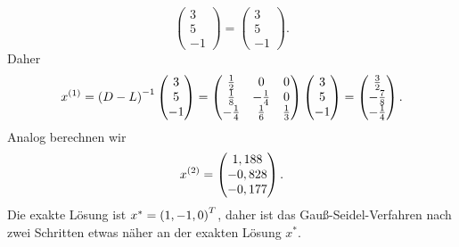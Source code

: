 \documentclass{exercise}
\begin{document}
\begin{enumerate}
\begin{itemize}
\[\begin{pmatrix}
                    3\\
                    5\\
                    -1
                \end{pmatrix} = \begin{pmatrix}
                    3\\
                    5\\
                    -1
                \end{pmatrix}.
            \]
            Daher
            \[
                x^{\parentheses*{1}} = \parentheses*{D - L}^{-1}\begin{pmatrix}
                    3\\
                    5\\
                    -1
                \end{pmatrix} = \begin{pmatrix}
                    \frac{1}{2} & 0 & 0\\
                    \frac{1}{8} & -\frac{1}{4} & 0\\
                    -\frac{1}{4} & \frac{1}{6} & \frac{1}{3}
                \end{pmatrix}\begin{pmatrix}
                    3\\
                    5\\
                    -1
                \end{pmatrix} = \begin{pmatrix}
                    \frac{3}{2}\\
                    -\frac{7}{8}\\
                    -\frac{1}{4}
                \end{pmatrix}.
            \]
            Analog berechnen wir
            \[
                x^{\parentheses*{2}} = \begin{pmatrix}
                    1,188\\
                    -0,828\\
                    -0,177
                \end{pmatrix}.
            \]
            Die exakte Lösung ist \(x^* = \parentheses*{1, -1, 0}^T\), daher ist das Gauß-Seidel-Verfahren nach zwei Schritten etwas näher an der exakten Lösung \(x^*\).
        \end{itemize}
    \end{enumerate}
\end{document}

